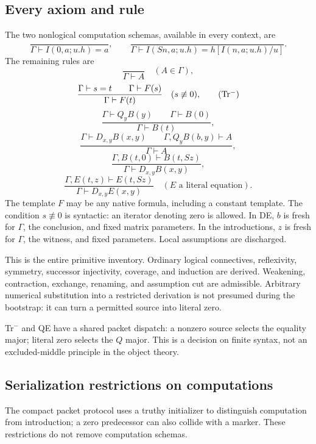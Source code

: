 \documentclass[11pt]{article}
\theoremstyle{definition}\newtheorem{definition}[theorem]{Definition}
\theoremstyle{remark}\newtheorem{remark}[theorem]{Remark}
\begin{document}
\subsection{Every axiom and rule}

The two nonlogical computation schemas, available in every context, are
\[
\frac{}{\Gamma\vdash I(0,a;u.h)=a},\qquad
\frac{}{\Gamma\vdash I(Sn,a;u.h)=h[I(n,a;u.h)/u]}.
\tag{$I_0,I_S$}
\]
The remaining rules are
\[
\frac{}{\Gamma\vdash A}\quad(A\in\Gamma),
\tag{Hyp}
\]
\[
\frac{\Gamma\vdash s=t\qquad\Gamma\vdash F(s)}
     {\Gamma\vdash F(t)}\quad(s\not\equiv0),
\tag{Tr$^{-}$}\label{main:tr}
\]
\[
\frac{\Gamma\vdash Q_yB(y)\qquad\Gamma\vdash B(0)}
     {\Gamma\vdash B(t)},
\tag{QE}
\]
\[
\frac{\Gamma\vdash D_{x,y}B(x,y)\qquad
      \Gamma,Q_yB(b,y)\vdash A}{\Gamma\vdash A},
\tag{DE}
\]
\[
\frac{\Gamma,B(t,0)\vdash B(t,Sz)}
     {\Gamma\vdash D_{x,y}B(x,y)},
\tag{DI-case}
\]
\[
\frac{\Gamma,E(t,z)\vdash E(t,Sz)}
     {\Gamma\vdash D_{x,y}E(x,y)}
\quad(E\text{ a literal equation}).
\tag{DI-progress}
\]
The template $F$ may be any native formula, including a constant
template. The condition $s\not\equiv0$ is syntactic: an iterator denoting
zero is allowed. In DE, $b$ is fresh for $\Gamma$, the conclusion, and
fixed matrix parameters. In the introductions, $z$ is fresh for
$\Gamma$, the witness, and fixed parameters. Local assumptions are
discharged.

This is the entire primitive inventory. Ordinary logical connectives,
reflexivity, symmetry, successor injectivity, coverage, and induction
are derived. Weakening, contraction, exchange, renaming, and assumption
cut are admissible. Arbitrary numerical substitution into a restricted
derivation is not presumed during the bootstrap: it can turn a
permitted source into literal zero.

Tr$^{-}$ and QE have a shared packet dispatch: a nonzero source selects
the equality major; literal zero selects the $Q$ major. This is a
decision on finite syntax, not an excluded-middle principle in the
object theory.

\subsection{Serialization restrictions on computations}

The compact packet protocol uses a truthy initializer to distinguish
computation from introduction; a zero predecessor can also collide
with a marker. These restrictions do not remove computation schemas.
\end{document}
